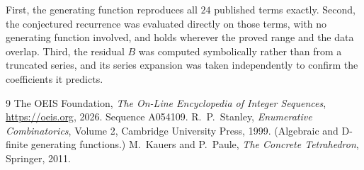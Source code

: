 \documentclass[11pt,a4paper]{article}
\theoremstyle{plain}
\theoremstyle{definition}
\begin{document}
First, the generating function reproduces all $24$ published terms exactly. Second,
the conjectured recurrence was evaluated directly on those terms, with no generating function
involved, and holds wherever the proved range and the data overlap. Third, the residual $B$ was
computed symbolically rather than from a truncated series, and its series expansion was taken
independently to confirm the coefficients it predicts.

\begin{thebibliography}{9}
 The OEIS Foundation, \emph{The On-Line Encyclopedia of Integer Sequences},
\url{https://oeis.org}, 2026. Sequence A054109.
 R.~P.~Stanley, \emph{Enumerative Combinatorics}, Volume 2, Cambridge
University Press, 1999. (Algebraic and D-finite generating functions.)
 M.~Kauers and P.~Paule, \emph{The Concrete Tetrahedron}, Springer, 2011.
\end{thebibliography}
\end{document}
